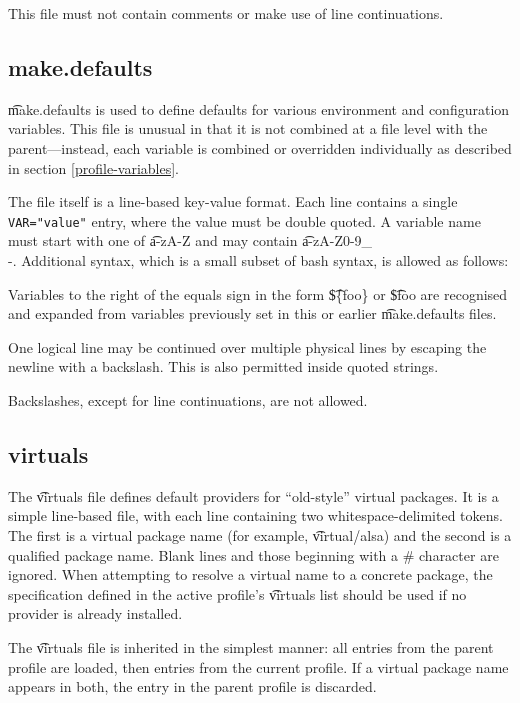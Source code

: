 This file must not contain comments or make use of line continuations.

\subsection{make.defaults}
\t{make.defaults} is used to define defaults for various environment and configuration variables.
This file is unusual in that it is not combined at a file level with the parent---instead, each
variable is combined or overridden individually as described in section \ref{profile-variables}.

The file itself is a line-based key-value format. Each line contains a single \verb|VAR="value"|
entry, where the value must be double quoted. A variable name must start with one of \t{a-zA-Z}
and may contain \t{a-zA-Z0-9\_\\-}. Additional syntax, which is a small subset of
bash syntax, is allowed as follows:

\begin{bulletlist}
\item Variables to the right of the equals sign in the form \t{\$\{foo\}} or \t{\$foo} are recognised and
  expanded from variables previously set in this or earlier \t{make.defaults} files.
\item One logical line may be continued over multiple physical lines by escaping the newline with a
  backslash. This is also permitted inside quoted strings.
\item Backslashes, except for line continuations, are not allowed.
\end{bulletlist}

\subsection{virtuals}
\label{profiles-virtuals}
The \t{virtuals} file defines default providers for ``old-style'' virtual packages. It is a simple
line-based file, with each line containing two whitespace-delimited tokens. The first is a virtual
package name (for example, \t{virtual/alsa}) and the second is a qualified package name. Blank lines
and those beginning with a \# character are ignored. When attempting to resolve a virtual name to a
concrete package, the specification defined in the active profile's \t{virtuals} list should be used if no
provider is already installed.

The \t{virtuals} file is inherited in the simplest manner: all entries from the parent profile are
loaded, then entries from the current profile. If a virtual package name appears in both, the entry
in the parent profile is discarded.

